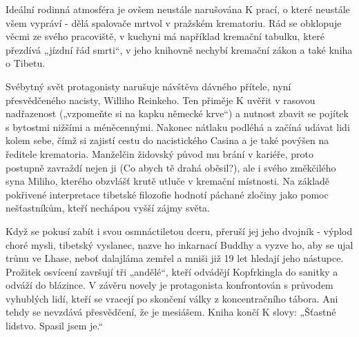 Ideální rodinná atmosféra je ovšem neustále narušována K prací, o které neustále všem vypráví - dělá spalovače mrtvol v pražském krematoriu.
Rád se obklopuje věcmi ze svého pracoviště, v kuchyni má například kremační tabulku, které přezdívá „jízdní řád smrti“, v jeho knihovně nechybí kremační zákon a také kniha o Tibetu.

Svébytný svět protagonisty narušuje návštěva dávného přítele, nyní přesvědčeného nacisty, Williho Reinkeho.
Ten přiměje K uvěřit v rasovou nadřazenost („vzpomeňte si na kapku německé krve“) a nutnost zbavit se pojítek s bytostmi nižšími a méněcennými.
Nakonec nátlaku podléhá a začíná udávat lidi kolem sebe, čímž si zajistí cestu do nacistického Casina a je také povýšen na ředitele krematoria.
Manželčin židovský původ mu brání v kariéře, proto postupně zavraždí nejen ji (Co abych tě drahá oběsil?), ale i svého změkčilého syna Miliho, kterého obzvlášť krutě utluče v kremační místnosti.
Na základě pokřivené interpretace tibetské filozofie hodnotí páchané zločiny jako pomoc nešťastníkům, kteří nechápou vyšší zájmy světa.

Když se pokusí zabít i svou osmnáctiletou dceru, přeruší jej jeho dvojník - výplod choré mysli, tibetský vyslanec, nazve ho inkarnací Buddhy a vyzve ho, aby se ujal trůnu ve Lhase, neboť dalajláma zemřel a mniši již 19 let hledají jeho nástupce.
Prožitek osvícení završují tři „andělé“, kteří odvádějí Kopfrkingla do sanitky a odváží do blázince.
V závěru novely je protagonista konfrontován s průvodem vyhublých lidí, kteří se vracejí po skončení války z koncentračního tábora.
Ani tehdy se nevzdává přesvědčení, že je mesiášem.
Kniha končí K slovy: „Šťastné lidstvo. Spasil jsem je.“
